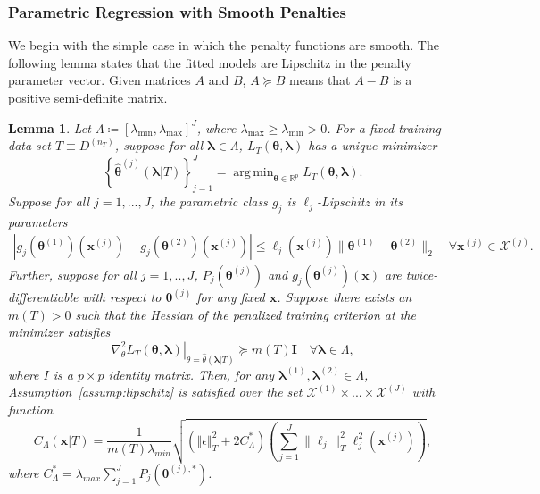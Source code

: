 \documentclass[12pt]{article} %
\newtheorem{lemma}{Lemma}
\theoremstyle{definition}
\DeclareMathOperator*{\argmin}{arg\,min}
\begin{document}
\subsubsection{Parametric Regression with Smooth Penalties}
\label{sec:param_smooth}
We begin with the simple case in which the penalty functions are smooth. The following lemma states that the fitted models are Lipschitz in the penalty parameter vector.
Given matrices $A$ and $B$, $A \succeq B$ means that $A - B$ is a positive semi-definite matrix.
\begin{lemma}
	\label{lemma:param_add}
	Let $\Lambda \coloneqq \left [ \lambda_{\min}, \lambda_{\max} \right ]^J$, where $\lambda_{\max} \ge \lambda_{\min} > 0$.
	For a fixed training data set $T \equiv D^{(n_T)}$, suppose for all $\boldsymbol{\lambda} \in \Lambda$, $L_T \left (\boldsymbol{\theta}, \boldsymbol{\lambda} \right)$ has a unique minimizer
	\begin{equation}
	\label{eq:param_add_estimator}
	\left\{
	\hat{\boldsymbol{\theta}}^{(j)}\left (\boldsymbol{\lambda} | T \right )
	\right\}_{j=1}^J =
	\argmin_{\boldsymbol{\theta} \in \mathbb{R}^p} L_T \left (\boldsymbol{\theta}, \boldsymbol{\lambda} \right).
	\end{equation}
	Suppose for all $j = 1,...,J$, the parametric class $g_j$ is $\ell_j$-Lipschitz in its parameters
	\begin{align}
	\left|
	g_j (\boldsymbol{\theta}^{(1)} )(\boldsymbol{x}^{(j)})
	-g_j (\boldsymbol{\theta}^{(2)} )(\boldsymbol{x}^{(j)})
	\right|
	\le
	\ell_j (\boldsymbol{x}^{(j)})
	\|\boldsymbol{\theta}^{(1)}-\boldsymbol{\theta}^{(2)}\|_{2}
	\quad
	\forall \boldsymbol{x}^{(j)} \in \mathcal{X}^{(j)}.
	\label{eq:lipschitz_g}
	\end{align}
	Further, suppose for all $j=1,..,J$, $P_j(\boldsymbol{\theta}^{(j)})$ and $g_j(\boldsymbol{\theta}^{(j)})(\boldsymbol{x})$ are twice-differentiable with respect to $\boldsymbol{\theta}^{(j)}$ for any fixed $\boldsymbol{x}$.
	Suppose there exists an $m(T) > 0$ such that the Hessian of the penalized training criterion at the minimizer satisfies
	\begin{equation}
	\left . \nabla_{\theta}^2 L_T \left (\boldsymbol{\theta}, \boldsymbol{\lambda} \right) \right |_{\theta = \hat{\theta}(\boldsymbol{\lambda} | T )} \succeq m(T) \boldsymbol{I}
	\quad \forall \boldsymbol{\lambda} \in \Lambda,
	\label{eq:smooth_pos_def}
	\end{equation}
	where $I$ is a $p \times p$ identity matrix.
	Then, for any $\boldsymbol{\lambda}^{(1)}, \boldsymbol{\lambda}^{(2)} \in \Lambda$,
	Assumption~\ref{assump:lipschitz} is satisfied over the set $\mathcal{X}^{(1)} \times ... \times \mathcal{X}^{(J)}$ with function
	\begin{equation}
	\label{eq:param_add_lipschitz}
	C_\Lambda(\boldsymbol{x} | T) =
	\frac{1}{m(T) \lambda_{min}}
	\sqrt{
		\left(
		\left\Vert \epsilon \right \Vert_T^2 + 2 C^*_{\Lambda}
		\right)
		\left(
		\sum_{j=1}^J  \|\ell_j\|_T^2 \ell_j^2(\boldsymbol{x}^{(j)})
		\right)
	},
	\end{equation}
	where $C^*_{\Lambda} = \lambda_{max}\sum_{j=1}^{J} P_{j}(\boldsymbol{\theta}^{(j),*})$.
\end{lemma}
\end{document}

